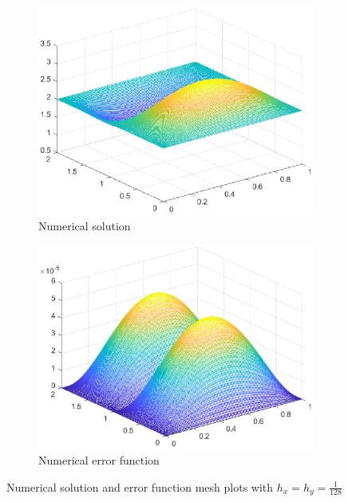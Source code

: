 \documentclass{homework}
\begin{document}
\begin{alphaparts}
		\begin{figure}[h]
			\begin{subfigure}{.45\textwidth}
				\centering
				\includegraphics[width=\textwidth]{p2c_u.eps}
				\caption{Numerical solution}
			\end{subfigure}
			\hfill
			\begin{subfigure}{.45\textwidth}
				\centering
				\includegraphics[width=\textwidth]{p2c_error.eps}
				\caption{Numerical error function}
			\end{subfigure}
			\caption{Numerical solution and error function mesh plots with $h_x = h_y=\frac{1}{128}$}
			\label{fig:p2c}
		\end{figure}
		

\end{alphaparts}
\end{document}
